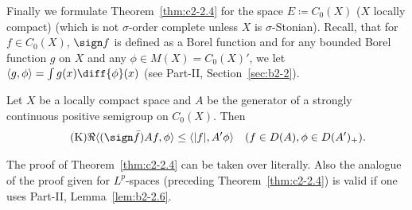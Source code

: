 Finally we formulate Theorem~\ref{thm:c2-2.4}   for the space $E \coloneq C_{0}(X)$ ($X$ locally compact) (which is not $\sigma$-order complete unless $X$ is $\sigma$-Stonian).
Recall, that for $f \in C_{0}(X)$, \mbox{$\sign f$} is defined as a Borel function and for any bounded Borel function $g$ on $X$ and any $\phi \in M(X) = C_{0}(X)'$, we let $\langle g,\phi \rangle = \int g(x) \diff{\phi}(x)$ (see Part-II, Section~\ref{sec:b2-2}).
\begin{theorem}\label{thm:c2-2.6}
%
Let $X$ be a locally compact space and $A$ be the generator of a strongly continuous positive semigroup on 
$C_{0}(X)$.
Then
\begin{equation*}\label{eq:c2-K-3} \tag{K}
\Re\langle(\sign \bar{f})Af,\phi \rangle \leq \langle |f|,A'\phi \rangle \quad (f \in D(A), \phi \in D(A')_{+}).
\end{equation*}
\end{theorem}
The proof of Theorem~\ref{thm:c2-2.4} can be taken over literally.
Also the analogue of the proof given for $L^p$-spaces (preceding Theorem~\ref{thm:c2-2.4})  is valid if one uses Part-II, Lemma~\ref{lem:b2-2.6}.
